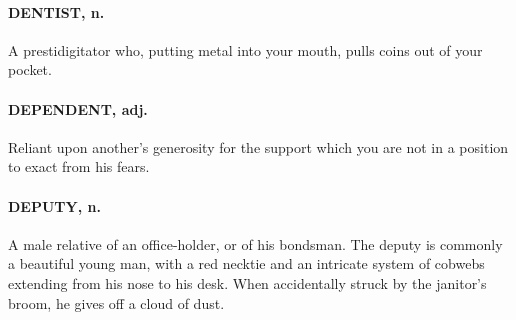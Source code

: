 \documentclass[11pt]{article}
\begin{document}
\paragraph{DENTIST, n.}  A prestidigitator who, putting metal into your mouth,
pulls coins out of your pocket.

\paragraph{DEPENDENT, adj.}  Reliant upon another's generosity for the support
which you are not in a position to exact from his fears.

\paragraph{DEPUTY, n.}  A male relative of an office-holder, or of his bondsman.
The deputy is commonly a beautiful young man, with a red necktie and
an intricate system of cobwebs extending from his nose to his desk.
When accidentally struck by the janitor's broom, he gives off a cloud
of dust.
\end{document}
